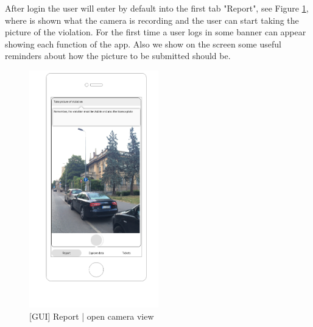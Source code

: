 After login the user will enter by default into the first tab "Report", see Figure \ref{fig:takepic}, where is shown what the camera is recording and the user can start taking the picture of the violation.
For the first time a user logs in some banner can appear showing each function of the app. Also we show on the screen some useful reminders about how the picture to be submitted should be.
\begin{figure}[H]
		\centering
      \includegraphics[width=0.5\textwidth]{GUI/takepic.png}
      \caption{[GUI] Report | open camera view}   \label{fig:takepic}
\end{figure}


